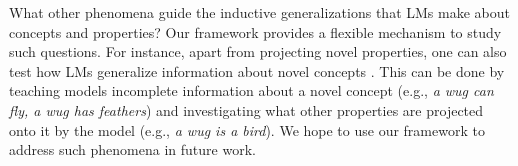 \documentclass[10pt,letterpaper]{article}
\newcommand{\km}[1]{\textcolor{purple}{$_{KM}$[#1]}}
\begin{document}
What other phenomena guide the inductive generalizations that LMs make about concepts and properties? 
Our framework provides a flexible mechanism to study such questions. For instance, apart from projecting novel properties, one can also test how LMs generalize information about novel concepts \citep{rogers2004semantic, kemp2011inductive}. This can be done by teaching models incomplete information about a novel concept (e.g., \textit{a wug can fly, a wug has feathers}) and investigating what other properties are projected onto it by the model (e.g., \textit{a wug is a bird}). We hope to use our framework to address such phenomena in future work.
\end{document}

